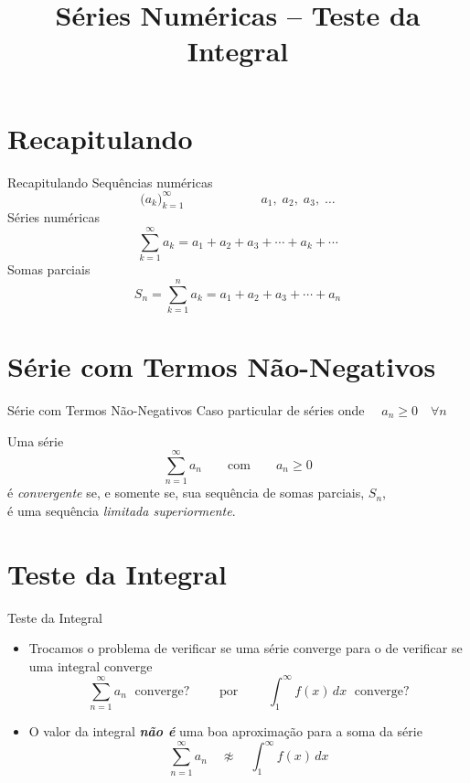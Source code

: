 \documentclass[fleqn,utf8,aspectratio=169,12pt]{beamer}
\title{Séries Numéricas -- Teste da Integral}
\begin{document}
\addtitle

\section{Recapitulando}

\begin{frame}{Recapitulando}
  Sequências numéricas
  \[
    \big( a_k \big)_{k=1}^\infty \qquad\qquad\qquad a_1,\; a_2,\; a_3,\; \dots
  \]
  \pause
  Séries numéricas
  \[
    \sum_{k=1}^\infty a_k = a_1 + a_2 + a_3 + \cdots + a_k + \cdots
  \]
  \pause
  Somas parciais
  \[
    S_n = \sum_{k=1}^n a_k = a_1 + a_2 + a_3 + \cdots + a_n
  \]
\end{frame}

\section{Série com Termos Não-Negativos}

\begin{frame}{Série com Termos Não-Negativos}
  Caso particular de séries onde $\quad a_n \geq 0 \quad \forall n$

  \pause
  \vspace{\baselineskip}
  Uma série
  \[\sum_{n=1}^\infty a_n \qquad \text{com} \qquad a_n\geq 0 \]
  é \emph{convergente} se, e somente se, sua sequência de somas parciais, $S_n$, \\
  é uma sequência \emph{limitada superiormente}.
\end{frame}

\section{Teste da Integral}

\begin{frame}{Teste da Integral}
  \begin{itemize}
    \item Trocamos o problema de verificar se uma série converge para o de
    verificar se uma integral converge
    \[ \sum_{n=1}^{\infty} a_n  \;\text{ converge?}
       \qquad \text{ por } \qquad
       \int_{1}^{\infty} f(x) \,dx  \;\text{ converge?}
    \]
    \pause
    \item O valor da integral \emph{\textbf{não é}} uma boa aproximação para a soma da série
    \[ \sum_{n=1}^{\infty} a_n  \quad \not\approx \quad \int_{1}^{\infty} f(x) \,dx\]
  \end{itemize}
\end{frame}
\end{document}
